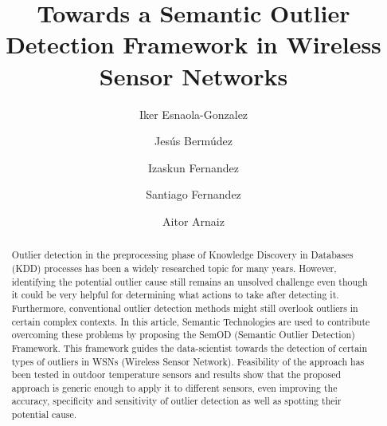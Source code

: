 \documentclass[runningheads,a4paper]{llncs}
\begin{document}
\mainmatter

\title{Towards a Semantic Outlier Detection Framework in Wireless Sensor Networks}
\author{Iker Esnaola-Gonzalez \and
Jesús Bermúdez \and
Izaskun Fernandez \and
Santiago Fernandez \and
Aitor Arnaiz}
\maketitle

\begin{abstract}
Outlier detection in the preprocessing phase of Knowledge Discovery in Databases (KDD) processes has been a widely researched topic for many years. However, identifying the potential outlier cause still remains an unsolved challenge even though it could be very helpful for determining what actions to take after detecting it. Furthermore, conventional outlier detection methods might still overlook outliers in certain complex contexts. In this article, Semantic Technologies are used to contribute overcoming these problems by proposing the SemOD (Semantic Outlier Detection) Framework. This framework guides the data-scientist towards the detection of certain types of outliers in WSNs (Wireless Sensor Network). Feasibility of the approach has been tested in outdoor temperature sensors and results show that the proposed approach is generic enough to apply it to different sensors, even improving the accuracy, specificity and sensitivity of outlier detection as well as spotting their potential cause.

\end{abstract}
\end{document}
